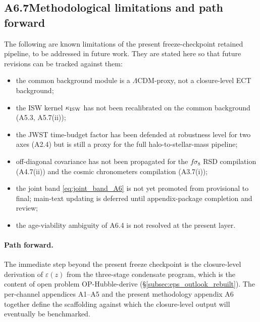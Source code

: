 \subsection*{A6.7\quad Methodological limitations and path forward}

The following are known limitations of the present
freeze-checkpoint retained pipeline, to be addressed in future
work. They are stated here so that future revisions can be
tracked against them:
\begin{itemize}
\item the common background module is a $\Lambda$CDM-proxy,
  not a closure-level ECT background;
\item the ISW kernel $\kappa_{\rm ISW}$ has not been recalibrated
  on the common background (A5.3, A5.7(ii));
\item the JWST time-budget factor has been defended at robustness
  level for two axes (A2.4) but is still a proxy for the full
  halo-to-stellar-mass pipeline;
\item off-diagonal covariance has not been propagated for the
  $f\sigma_8$ RSD compilation (A4.7(ii)) and the cosmic
  chronometers compilation (A3.7(i));
\item the joint band \eqref{eq:joint_band_A6} is not yet
  promoted from provisional to final; main-text updating is
  deferred until appendix-package completion and review;
\item the age-viability ambiguity of A6.4 is not resolved at
  the present layer.
\end{itemize}

\paragraph{Path forward.}
The immediate step beyond the present freeze checkpoint is the
closure-level derivation of $\varepsilon(z)$ from the three-stage
condensate program, which is the content of open problem
OP-Hubble-derive (\S\ref{subsec:eps_outlook_rebuilt}). The
per-channel appendices A1--A5 and the present methodology
appendix A6 together define the scaffolding against which the
closure-level output will eventually be benchmarked.

